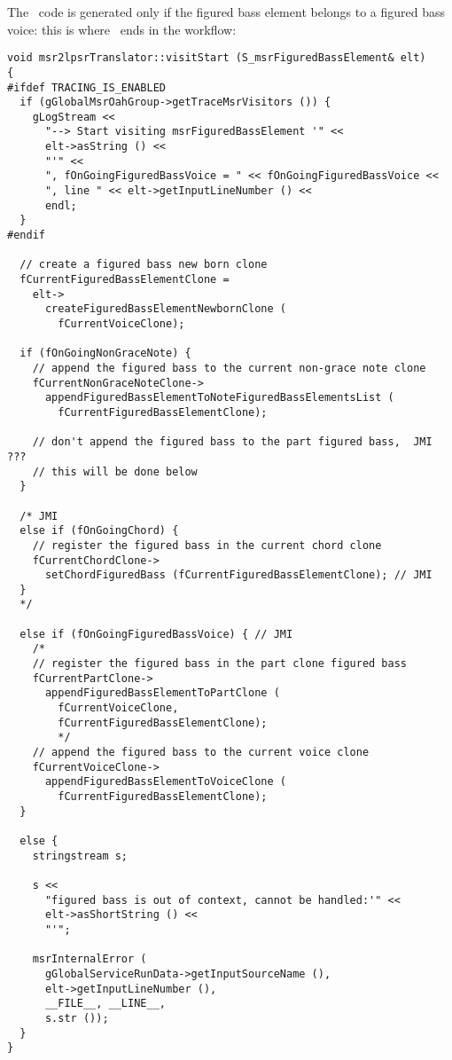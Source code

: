 The \lily\ code is generated only if the figured bass element belongs to a figured bass voice: this is where \denorm\ ends in the workflow:%
\begin{lstlisting}[language=CPlusPlus]
void msr2lpsrTranslator::visitStart (S_msrFiguredBassElement& elt)
{
#ifdef TRACING_IS_ENABLED
  if (gGlobalMsrOahGroup->getTraceMsrVisitors ()) {
    gLogStream <<
      "--> Start visiting msrFiguredBassElement '" <<
      elt->asString () <<
      "'" <<
      ", fOnGoingFiguredBassVoice = " << fOnGoingFiguredBassVoice <<
      ", line " << elt->getInputLineNumber () <<
      endl;
  }
#endif

  // create a figured bass new born clone
  fCurrentFiguredBassElementClone =
    elt->
      createFiguredBassElementNewbornClone (
        fCurrentVoiceClone);

  if (fOnGoingNonGraceNote) {
    // append the figured bass to the current non-grace note clone
    fCurrentNonGraceNoteClone->
      appendFiguredBassElementToNoteFiguredBassElementsList (
      	fCurrentFiguredBassElementClone);

    // don't append the figured bass to the part figured bass,  JMI ???
    // this will be done below
  }

  /* JMI
  else if (fOnGoingChord) {
    // register the figured bass in the current chord clone
    fCurrentChordClone->
      setChordFiguredBass (fCurrentFiguredBassElementClone); // JMI
  }
  */

  else if (fOnGoingFiguredBassVoice) { // JMI
    /*
    // register the figured bass in the part clone figured bass
    fCurrentPartClone->
      appendFiguredBassElementToPartClone (
        fCurrentVoiceClone,
        fCurrentFiguredBassElementClone);
        */
    // append the figured bass to the current voice clone
    fCurrentVoiceClone->
      appendFiguredBassElementToVoiceClone (
        fCurrentFiguredBassElementClone);
  }

  else {
    stringstream s;

    s <<
      "figured bass is out of context, cannot be handled:'" <<
      elt->asShortString () <<
      "'";

    msrInternalError (
      gGlobalServiceRunData->getInputSourceName (),
      elt->getInputLineNumber (),
      __FILE__, __LINE__,
      s.str ());
  }
}
\end{lstlisting}

